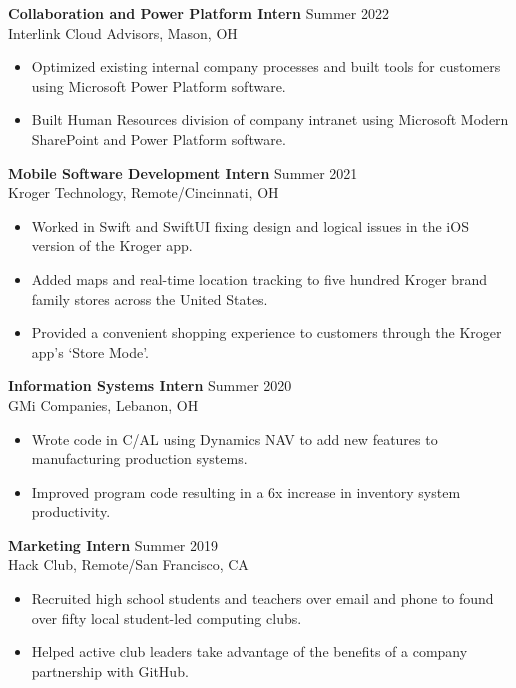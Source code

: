 \documentclass[margin]{res}
\begin{document}
\begin{resume}
                 {\bf Collaboration and Power Platform Intern} \hfill        Summer 2022 \\
                Interlink Cloud Advisors, Mason, OH
                  \begin{itemize}
                   \item Optimized existing internal company processes and built tools for customers using Microsoft Power Platform software.
                   \item Built Human Resources division of company intranet using Microsoft Modern SharePoint and Power Platform software.
                   \end{itemize} 
                {\bf Mobile Software Development Intern} \hfill        Summer 2021 \\
                Kroger Technology, Remote/Cincinnati, OH
                  \begin{itemize}
                    \item Worked in Swift and SwiftUI fixing design and logical  issues in the iOS version of the Kroger app. 
                    \item Added maps and real-time location tracking to five hundred Kroger brand family stores across the United States.
                    \item Provided a convenient shopping experience to customers through the Kroger app's ‘Store Mode’.
                   \end{itemize} 
                {\bf Information Systems Intern} \hfill Summer 2020\\
                GMi Companies, Lebanon, OH
                \begin {itemize}
                    \item  Wrote code in C/AL using Dynamics NAV to add new features to manufacturing production systems.
                    \item  Improved program code resulting in a 6x increase in inventory system productivity.
                \end{itemize}
                 {\bf Marketing Intern  } \hfill Summer 2019\\
               Hack Club, Remote/San Francisco, CA
                \begin {itemize}
                    \item  Recruited high school students and teachers over email and phone to found over fifty local student-led computing clubs.
                    \item Helped active club leaders take advantage of the benefits of a company partnership with GitHub.
                \end{itemize}
 


\end{resume}
\end{document}
